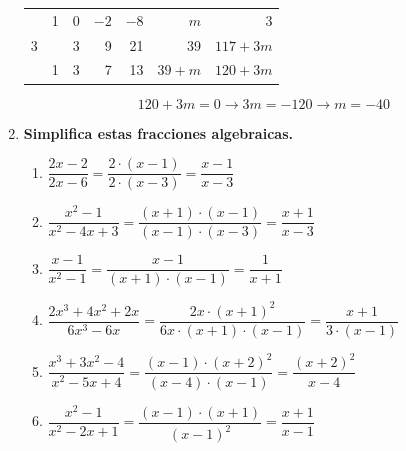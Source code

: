 \documentclass[a4paper,12pt]{article}
\begin{document}
\begin{enumerate}
\begin{center}
\begin{tabular}{r|rrrrrr}
  & 1 & 0 & $-2$ & $-8$ & $m$ & 3 \\
3 &   & 3 & 9 & 21 & 39 & $117 + 3m$ \\ \hline
  & 1 & 3 & 7 & 13 & $39 + m$ & \multicolumn{1}{|r}{$120 + 3m$}
\end{tabular}
\end{center}

\vspace{0.3cm}

\[
120 + 3m = 0 \longrightarrow 3m = -120 \longrightarrow m = -40
\]

\item \textbf{Simplifica estas fracciones algebraicas.}

\begin{enumerate}[label=\textbf{\alph*)}]
    \item $\dfrac{2x - 2}{2x - 6} = \dfrac{2 \cdot (x - 1)}{2 \cdot (x - 3)} = \dfrac{x - 1}{x - 3}$
    
    \vspace{0.3cm}
    
    \item $\dfrac{x^2 - 1}{x^2 - 4x + 3} = \dfrac{(x + 1) \cdot (x - 1)}{(x - 1) \cdot (x - 3)} = \dfrac{x + 1}{x - 3}$
    
    \vspace{0.3cm}
    
    \item $\dfrac{x - 1}{x^2 - 1} = \dfrac{x - 1}{(x + 1) \cdot (x - 1)} = \dfrac{1}{x + 1}$
    
    \vspace{0.3cm}
    
    \item $\dfrac{2x^3 + 4x^2 + 2x}{6x^3 - 6x} = \dfrac{2x \cdot (x + 1)^2}{6x \cdot (x + 1) \cdot (x - 1)} = \dfrac{x + 1}{3 \cdot (x - 1)}$
    
    \vspace{0.3cm}
    
    \item $\dfrac{x^3 + 3x^2 - 4}{x^2 - 5x + 4} = \dfrac{(x - 1) \cdot (x + 2)^2}{(x - 4) \cdot (x - 1)} = \dfrac{(x + 2)^2}{x - 4}$
    
    \vspace{0.3cm}
    
    \item $\dfrac{x^2 - 1}{x^2 - 2x + 1} = \dfrac{(x - 1) \cdot (x + 1)}{(x - 1)^2} = \dfrac{x + 1}{x - 1}$
\end{enumerate}


\end{enumerate}
\end{document}
